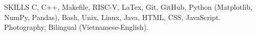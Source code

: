 \begin{rSection}{SKILLS}
C, C++, Makefile, RISC-V, LaTex, Git, GitHub, Python (Matplotlib, NumPy, Pandas), Bash, Unix, Linux, 
Java,
HTML, CSS, JavaScript.
    Photography, Bilingual (Vietnamese-English). 
\end{rSection}